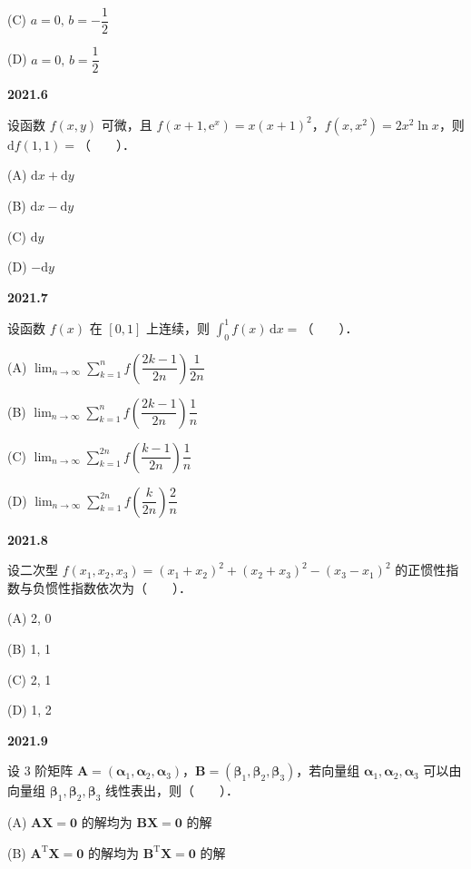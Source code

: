 \documentclass[UTF8,12pt,fontset=windows]{ctexart}
\begin{document}
(C) $a = 0,\, b = -\dfrac{1}{2}$

(D) $a = 0,\, b = \dfrac{1}{2}$

\vfill
\newpage
{\large\bfseries 2021.6}

设函数 $f(x,y)$ 可微，且 $f(x+1, \mathrm{e}^x) = x(x+1)^2$，$f(x, x^2) = 2x^2\ln x$，则 $\mathrm{d}f(1,1) =$（　　）．

(A) $\mathrm{d}x + \mathrm{d}y$

(B) $\mathrm{d}x - \mathrm{d}y$

(C) $\mathrm{d}y$

(D) $-\mathrm{d}y$

\vfill
\newpage
{\large\bfseries 2021.7}

设函数 $f(x)$ 在 $[0,1]$ 上连续，则 $\displaystyle\int_{0}^{1} f(x)\,\mathrm{d}x =$（　　）．

(A) $\displaystyle\lim_{n\to\infty} \sum_{k=1}^{n} f\left(\dfrac{2k-1}{2n}\right) \dfrac{1}{2n}$

(B) $\displaystyle\lim_{n\to\infty} \sum_{k=1}^{n} f\left(\dfrac{2k-1}{2n}\right) \dfrac{1}{n}$

(C) $\displaystyle\lim_{n\to\infty} \sum_{k=1}^{2n} f\left(\dfrac{k-1}{2n}\right) \dfrac{1}{n}$

(D) $\displaystyle\lim_{n\to\infty} \sum_{k=1}^{2n} f\left(\dfrac{k}{2n}\right) \dfrac{2}{n}$

\vfill
\newpage
{\large\bfseries 2021.8}

设二次型 $f(x_1, x_2, x_3) = (x_1 + x_2)^2 + (x_2 + x_3)^2 - (x_3 - x_1)^2$ 的正惯性指数与负惯性指数依次为（　　）．

(A) 2, 0

(B) 1, 1

(C) 2, 1

(D) 1, 2

\vfill
\newpage
{\large\bfseries 2021.9}

设 3 阶矩阵 $\boldsymbol{A} = (\boldsymbol{\alpha}_1, \boldsymbol{\alpha}_2, \boldsymbol{\alpha}_3)$，$\boldsymbol{B} = (\boldsymbol{\beta}_1, \boldsymbol{\beta}_2, \boldsymbol{\beta}_3)$，若向量组 $\boldsymbol{\alpha}_1, \boldsymbol{\alpha}_2, \boldsymbol{\alpha}_3$ 可以由向量组 $\boldsymbol{\beta}_1, \boldsymbol{\beta}_2, \boldsymbol{\beta}_3$ 线性表出，则（　　）．

(A) $\boldsymbol{A}\boldsymbol{X} = \boldsymbol{0}$ 的解均为 $\boldsymbol{B}\boldsymbol{X} = \boldsymbol{0}$ 的解

(B) $\boldsymbol{A}^{\mathrm{T}}\boldsymbol{X} = \boldsymbol{0}$ 的解均为 $\boldsymbol{B}^{\mathrm{T}}\boldsymbol{X} = \boldsymbol{0}$ 的解
\end{document}
